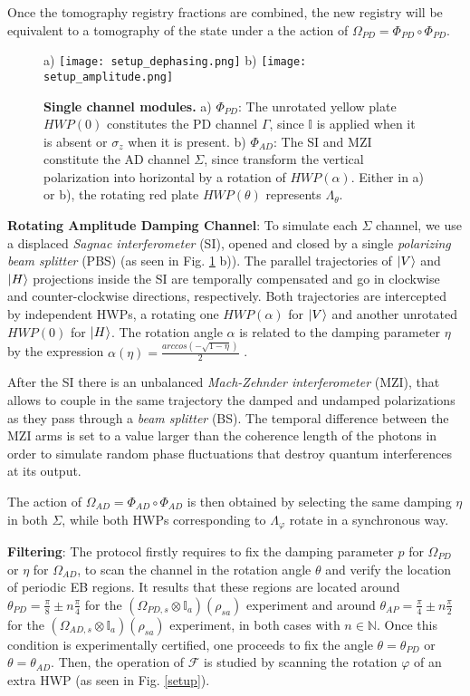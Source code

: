 \documentclass[aps,twocolumn,pra,superscriptaddress,showpacs,showkeys,floatfix]{revtex4-1}
\begin{document}
Once the tomography registry fractions are combined, the new registry will be equivalent to a tomography of the state under a the action of $\Omega_{PD}=\Phi_{PD} \circ \Phi_{PD}$.

\begin{figure}[h]
	\centering
	a) \texttt{[image: setup\_dephasing.png]}
	b) \texttt{[image: setup\_amplitude.png]}
	\caption{\textbf{Single channel modules.} a) $\Phi_{PD}$:  The unrotated yellow plate $HWP(0)$ constitutes the PD channel $\Gamma$, since $\mathbb{I}$ is applied when it is absent or $\sigma_{z}$ when it is present. b) $\Phi_{AD}$: The SI and MZI constitute the AD channel $\Sigma$, since transform the vertical polarization into horizontal by a rotation of $HWP(\alpha)$. Either in a) or b), the rotating red plate $HWP(\theta)$ represents $\Lambda_{\theta}$.}
	\label{channels}
\end{figure}

\textbf{Rotating Amplitude Damping Channel}: To simulate each $\Sigma$ channel, we use a displaced \textit{Sagnac interferometer} (SI), opened and closed by a single \textit{polarizing beam splitter} (PBS) (as seen in Fig. \ref{channels} b)). The parallel trajectories of $\ket{V}$ and $\ket{H}$ projections inside the SI are temporally compensated and go in clockwise and counter-clockwise directions, respectively. Both trajectories are intercepted by independent HWPs, a rotating one $HWP(\alpha)$ for $\ket{V}$ and another unrotated $HWP(0)$ for $\ket{H}$. The rotation angle $\alpha$ is related to the damping parameter $\eta$ by the expression $\alpha(\eta)=\frac{arccos(-\sqrt{1-\eta})}{2}$ \cite{cutandpaste,channelcapacity}.

After the SI there is an unbalanced \textit{Mach-Zehnder interferometer} (MZI), that allows to couple in the same trajectory the damped and undamped polarizations as they pass through a \textit{beam splitter} (BS). The temporal difference between the MZI arms is set to a value larger than the coherence length of the photons in order to simulate random phase fluctuations that destroy quantum interferences at its output.
 
The action of $\Omega_{AD}=\Phi_{AD} \circ \Phi_{AD}$ is then obtained by selecting the same damping $\eta$ in both $\Sigma$, while both HWPs corresponding to $\Lambda_{\varphi}$ rotate in a synchronous way.

\textbf{Filtering}: The protocol firstly requires to fix the damping parameter $p$ for $\Omega_{PD}$ or $\eta$ for $\Omega_{AD}$, to scan the channel in the rotation angle $\theta$ and verify the location of periodic EB regions.  It results that these regions are located around $\theta_{PD}=\frac{\pi}{8}\pm n\frac{\pi}{4}$ for the $(\Omega_{PD,s}\otimes\mathbb{I}_{a})(\rho_{sa})$ experiment and around $\theta_{AP}=\frac{\pi}{4}\pm n\frac{\pi}{2}$ for the $(\Omega_{AD,s}\otimes\mathbb{I}_{a})(\rho_{sa})$ experiment, in both cases with $n\in \mathbb{N}$. Once this condition is experimentally certified, one proceeds to fix the angle $\theta=\theta_{PD}$ or $\theta=\theta_{AD}$. Then, the operation of $\mathcal{F}$ is studied by scanning the rotation $\varphi$ of an extra HWP (as seen in Fig. \ref{setup}). 
\end{document}
